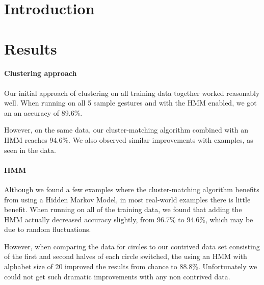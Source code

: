 \documentclass[12pt]{article}
\begin{document}
\maketitle


\section{Introduction}

\section{Results}\label{results}
\paragraph{Clustering approach}
Our initial approach of clustering on all training data together
worked reasonably well.  When running on all 5 sample gestures and
with the HMM enabled, we got an an accuracy of 89.6\%.

However, on the same data, our cluster-matching algorithm combined with
an HMM reaches 94.6\%.  We also observed similar improvements with examples,
as seen in the data.

\paragraph{HMM}
Although we found a few examples where the cluster-matching algorithm
benefits from using a Hidden Markov Model, in most real-world examples
there is little benefit.  When running on all of the training data,
we found that adding the HMM actually decreased accuracy slightly,
from 96.7\% to 94.6\%, which may be due to random fluctuations.

However, when comparing the data for circles to our contrived data
set consisting of the first and second halves of each circle switched,
the using an HMM with alphabet size of 20 improved the results from chance
to 88.8\%.  Unfortunately we could not get such dramatic improvements with
any non contrived data.
\end{document}
